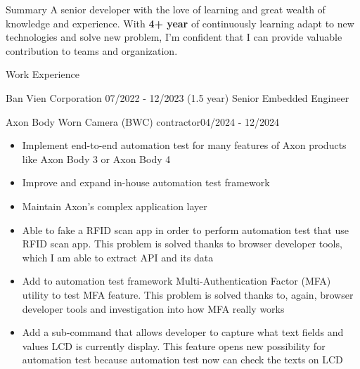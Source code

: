 \documentclass{resume} %
\begin{document}
\begin{rSection}{Summary}
A senior developer with the love of learning and great wealth of knowledge and experience. With \textbf{4+ year} of continuously learning adapt to new technologies and solve new problem, I'm confident that I can provide valuable contribution to teams and organization.
\end{rSection}


\begin{rSection}{Work Experience}
    \begin{rCompanySubsection}
        {Ban Vien Corporation}
        {07/2022 - 12/2023 (1.5 year)}
        {Senior Embedded Engineer}
        {}
        \begin{rProjectSubsubsectionV2}{Axon Body Worn Camera (BWC) contractor}{04/2024 - 12/2024}{
            \begin{itemize}
                \item Implement end-to-end automation test for many features of Axon products like Axon Body 3 or Axon Body 4
                \item Improve and expand in-house automation test framework
                \item Maintain Axon's complex application layer
            \end{itemize}
        }{
            \begin{itemize}
                \item Able to fake a RFID scan app in order to perform automation test that use RFID scan app. This problem is solved thanks to browser developer tools, which I am able to extract API and its data
                \item Add to automation test framework Multi-Authentication Factor (MFA) utility to test MFA feature. This problem is solved thanks to, again, browser developer tools and investigation into how MFA really works
                \item Add a sub-command that allows developer to capture what text fields and values LCD is currently display. This feature opens new possibility for automation test because automation test now can check the texts on LCD

\end{itemize}}
\end{rProjectSubsubsectionV2}
\end{rCompanySubsection}
\end{rSection}
\end{document}
